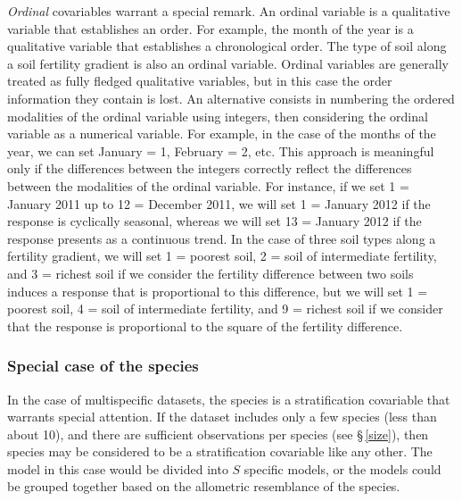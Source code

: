 \emph{Ordinal} covariables warrant a special remark. An ordinal variable is a qualitative variable that establishes an order. For example, the month of the year is a qualitative variable that establishes a chronological order. The type of soil along a soil fertility gradient is also an ordinal variable. Ordinal variables are generally treated as fully fledged qualitative variables, but in this case the order information they contain is lost. An alternative consists in numbering the ordered modalities of the ordinal variable using integers, then considering the ordinal variable as a numerical variable. For example, in the case of the months of the year, we can set January = 1, February = 2, etc. This approach is meaningful only if the differences between the integers correctly reflect the differences between the modalities of the ordinal variable. For instance, if we set 1 = January 2011 up to 12 = December 2011, we will set 1 = January 2012 if the response is cyclically seasonal, whereas we will set 13 = January 2012 if the response presents as a continuous trend. In the case of three soil types along a fertility gradient, we will set 1 = poorest soil, 2 = soil of intermediate fertility, and 3 = richest soil if we consider the fertility difference between two soils induces a response that is proportional to this difference, but we will set 1 = poorest soil, 4 = soil of intermediate fertility, and 9 = richest soil if we consider that the response is proportional to the square of the fertility difference.

\subsubsection{Special case of the species}

In the case of multispecific datasets, the species is a stratification covariable that warrants special attention. If the dataset includes only a few species (less than about 10), and there are sufficient observations per species (see \S\,\ref{size}), then species may be considered to be a stratification covariable like any other. The model in this case would be divided into $S$ specific models, or the models could be grouped together based on the allometric resemblance of the species.

